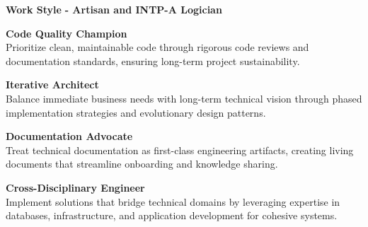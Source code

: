 \documentclass[a4paper,10pt]{article}
\begin{document}

\vspace{0.7cm}
\noindent
\begin{minipage}{\textwidth}
	{\large\bfseries\color{darkblue}\selectfont Work Style}
	{\small\bfseries\color{darkblue}\selectfont - Artisan and INTP-A Logician}
	\vspace{0.5cm}

	\begin{minipage}{0.48\textwidth}
		\noindent\textbf{Code Quality Champion} \\
		Prioritize clean, maintainable code through rigorous code reviews and documentation standards, ensuring long-term project sustainability.

		\vspace{0.3cm}
		\noindent\textbf{Iterative Architect} \\
		Balance immediate business needs with long-term technical vision through phased implementation strategies and evolutionary design patterns.
	\end{minipage}
	\hfill
	\begin{minipage}{0.48\textwidth}
		\noindent\textbf{Documentation Advocate} \\
		Treat technical documentation as first-class engineering artifacts, creating living documents that streamline onboarding and knowledge sharing.

		\vspace{0.3cm}
		\noindent\textbf{Cross-Disciplinary Engineer} \\
		Implement solutions that bridge technical domains by leveraging expertise in databases, infrastructure, and application development for cohesive systems.
	\end{minipage}
\end{minipage}
\end{document}
